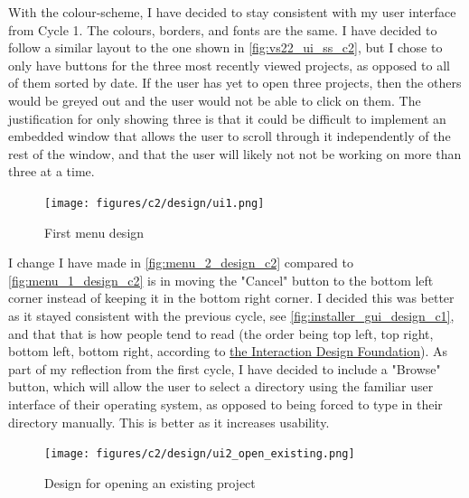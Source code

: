 \documentclass[11pt]{article}
\begin{document}
                With the colour-scheme, I have decided to stay consistent with my user interface from Cycle 1. The colours, borders, and fonts are the same. I have decided to follow a similar layout to the one shown in \autoref{fig:vs22_ui_ss_c2}, but I chose to only have buttons for the three most recently viewed projects, as opposed to all of them sorted by date. If the user has yet to open three projects, then the others would be greyed out and the user would not be able to click on them. The justification for only showing three is that it could be difficult to implement an embedded window that allows the user to scroll through it independently of the rest of the window, and that the user will likely not not be working on more than three at a time. 

                \begin{figure}[!ht]
                    \centering
                    \texttt{[image: figures/c2/design/ui1.png]}
                    \caption{First menu design}
                    \label{fig:menu_1_design_c2}
                \end{figure}

                I change I have made in \autoref{fig:menu_2_design_c2} compared to \autoref{fig:menu_1_design_c2} is in moving the "Cancel" button to the bottom left corner instead of keeping it in the bottom right corner. I decided this was better as it stayed consistent with the previous cycle, see \autoref{fig:installer_gui_design_c1}, and that that is how people tend to read (the order being top left, top right, bottom left, bottom right, according to \href{https://www.interaction-design.org/literature/article/visual-hierarchy-organizing-content-to-follow-natural-eye-movement-patterns}{the Interaction Design Foundation}). As part of my reflection from the first cycle, I have decided to include a "Browse" button, which will allow the user to select a directory using the familiar user interface of their operating system, as opposed to being forced to type in their directory manually. This is better as it increases usability. 

                \clearpage
                \begin{figure}[!ht]
                    \centering
                    \texttt{[image: figures/c2/design/ui2\_open\_existing.png]}
                    \caption{Design for opening an existing project}
                    \label{fig:menu_2_design_c2}
                \end{figure}
\end{document}
